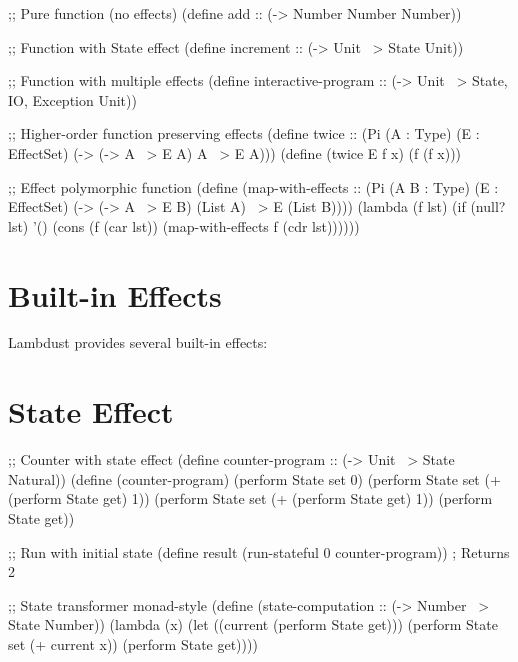 \begin{example}
\begin{lambdustcode}
;; Pure function (no effects)
(define add :: (-> Number Number Number))

;; Function with State effect
(define increment :: (-> Unit ~> {State} Unit))

;; Function with multiple effects  
(define interactive-program :: (-> Unit ~> {State, IO, Exception} Unit))

;; Higher-order function preserving effects
(define twice :: (Pi (A : Type) (E : EffectSet)
                     (-> (-> A ~> E A) A ~> E A)))
(define (twice E f x) (f (f x)))

;; Effect polymorphic function
(define (map-with-effects :: (Pi (A B : Type) (E : EffectSet)
                                 (-> (-> A ~> E B) (List A) ~> E (List B))))
  (lambda (f lst)
    (if (null? lst)
        '()
        (cons (f (car lst)) 
              (map-with-effects f (cdr lst))))))
\end{lambdustcode}
\end{example}

\section{Built-in Effects}
\label{sec:builtin-effects}


Lambdust provides several built-in effects:

\section{State Effect}
\label{sec:state-effect}

\begin{example}
\begin{lambdustcode}
;; Counter with state effect
(define counter-program :: (-> Unit ~> {State} Natural))
(define (counter-program)
  (perform State set 0)
  (perform State set (+ (perform State get) 1))
  (perform State set (+ (perform State get) 1))  
  (perform State get))

;; Run with initial state
(define result (run-stateful 0 counter-program))  ; Returns 2

;; State transformer monad-style
(define (state-computation :: (-> Number ~> {State} Number))
  (lambda (x)
    (let ((current (perform State get)))
      (perform State set (+ current x))
      (perform State get))))
\end{lambdustcode}
\end{example}

